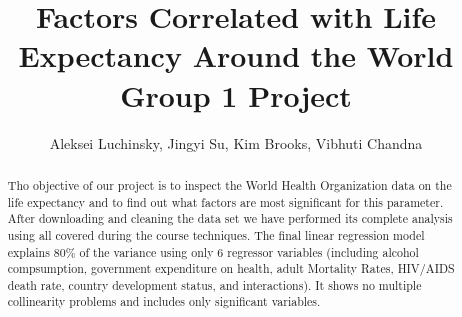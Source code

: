 \documentclass{article}
\begin{document}
\begin{titlepage}
\thispagestyle{empty}
\title{Factors Correlated with Life Expectancy Around the World\\
\large Group 1 Project}
\author{Aleksei Luchinsky, Jingyi Su, Kim Brooks, Vibhuti Chandna}
\date{}
\maketitle
\begin{abstract}
  Tho objective of our project is to inspect the World Health Organization data on the life expectancy and to find out what factors are most significant for this parameter. After downloading and cleaning the data set we have performed its complete analysis using all covered during the course techniques. The final linear regression model explains 80\% of the variance using only 6 regressor variables (including alcohol compsumption, government expenditure on health, adult Mortality Rates, HIV/AIDS death rate, country development status, and interactions). It  shows no multiple collinearity problems and includes only significant variables.
\end{abstract}
\tableofcontents  
\end{titlepage}

\clearpage\newpage
\setcounter{page}{1}

\doublespacing 







\let\Section\section 
\def\section*#1{\Section{#1}} 


\end{document}
